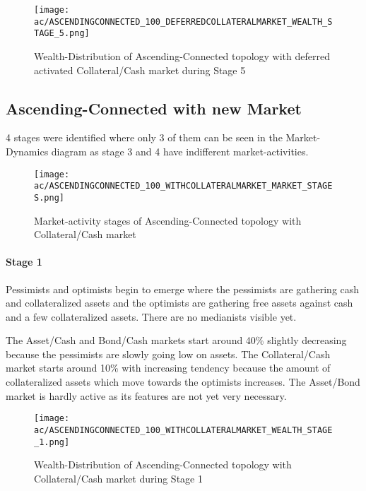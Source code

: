 \documentclass[Bachelorarbeit.tex]{subfiles}
\begin{document}
\begin{figure}[H]
	\centering
  \texttt{[image: ac/ASCENDINGCONNECTED\_100\_DEFERREDCOLLATERALMARKET\_WEALTH\_STAGE\_5.png]}
  	\caption{Wealth-Distribution of Ascending-Connected topology with deferred activated Collateral/Cash market during Stage 5}	\label{fig:markets_ASCENDINGCONNECTED_100_DEFERREDCOLLATERALMARKET_WEALTH_STAGE_5}
\end{figure}

\subsection{Ascending-Connected with new Market}

4 stages were identified where only 3 of them can be seen in the Market-Dynamics diagram as stage 3 and 4 have indifferent market-activities.

\begin{figure}[H]
	\centering
  \texttt{[image: ac/ASCENDINGCONNECTED\_100\_WITHCOLLATERALMARKET\_MARKET\_STAGES.png]}
  	\caption{Market-activity stages of Ascending-Connected topology with Collateral/Cash market}
	\label{fig:markets_ASCENDINGCONNECTED_100_WITHCOLLATERALMARKET_MARKET_STAGES}
\end{figure}

\paragraph{Stage 1}
Pessimists and optimists begin to emerge where the pessimists are gathering cash and collateralized assets and the optimists are gathering free assets against cash and a few collateralized assets. There are no medianists visible yet.

\medskip

The Asset/Cash and Bond/Cash markets start around 40\% slightly decreasing because the pessimists are slowly going low on assets. The Collateral/Cash market starts around 10\% with increasing tendency because the amount of collateralized assets which move towards the optimists increases. The Asset/Bond market is hardly active as its features are not yet very necessary.
		
\begin{figure}[H]
	\centering
  \texttt{[image: ac/ASCENDINGCONNECTED\_100\_WITHCOLLATERALMARKET\_WEALTH\_STAGE\_1.png]}
  	\caption{Wealth-Distribution of Ascending-Connected topology with Collateral/Cash market during Stage 1}
	\label{fig:wealth_ASCENDINGCONNECTED_100_WITHCOLLATERALMARKET_WEALTH_STAGE_1}
\end{figure}
\end{document}
